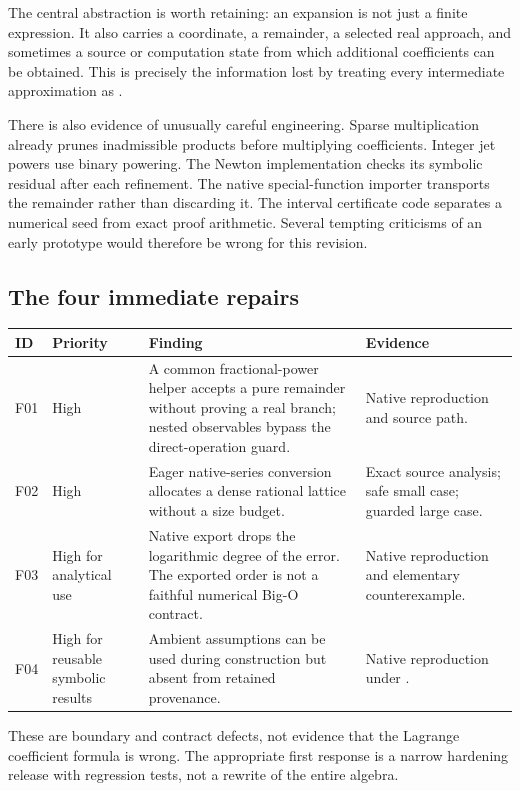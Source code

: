 \documentclass[11pt,a4paper]{article}
\newcommand{\code}[1]{\texttt{\detokenize{#1}}}
\begin{document}
The central abstraction is worth retaining: an expansion is not just a finite expression. It also carries a coordinate, a remainder, a selected real approach, and sometimes a source or computation state from which additional coefficients can be obtained. This is precisely the information lost by treating every intermediate approximation as \code{Normal[Series[...]]}.

There is also evidence of unusually careful engineering. Sparse multiplication already prunes inadmissible products before multiplying coefficients. Integer jet powers use binary powering. The Newton implementation checks its symbolic residual after each refinement. The native special-function importer transports the \code{SeriesData} remainder rather than discarding it. The interval certificate code separates a numerical seed from exact proof arithmetic. Several tempting criticisms of an early prototype would therefore be wrong for this revision.\cite{main,incremental,native,certificates}

\subsection{The four immediate repairs}
\begin{longtable}{@{}p{}p{}p{}p{}@{}}
\toprule
ID & Priority & Finding & Evidence\\\midrule\endhead
F01 & High & A common fractional-power helper accepts a pure remainder without proving a real branch; nested observables bypass the direct-operation guard. & Native reproduction and source path.\\
F02 & High & Eager native-series conversion allocates a dense rational lattice without a size budget. & Exact source analysis; safe small case; guarded large case.\\
F03 & High for analytical use & Native export drops the logarithmic degree of the error. The exported order is not a faithful numerical Big-O contract. & Native reproduction and elementary counterexample.\\
F04 & High for reusable symbolic results & Ambient assumptions can be used during construction but absent from retained provenance. & Native reproduction under \code{Assuming}.\\
\bottomrule
\end{longtable}

These are boundary and contract defects, not evidence that the Lagrange coefficient formula is wrong. The appropriate first response is a narrow hardening release with regression tests, not a rewrite of the entire algebra.
\end{document}
